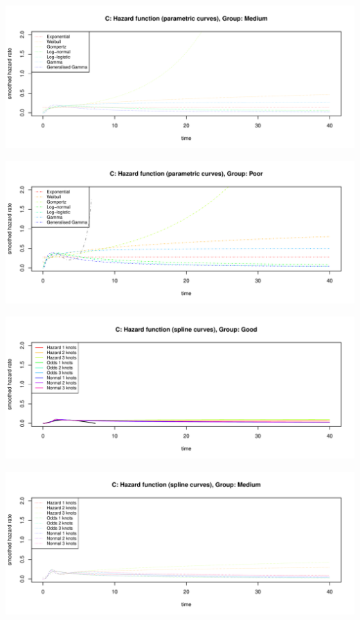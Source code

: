 \documentclass[
]{article}
\begin{document}
\begin{flushleft}\includegraphics[height=0.29\textheight]{BC_OS_output/Images/Figure_validate_extrapolation_hr-2} \end{flushleft}

\begin{flushleft}\includegraphics[height=0.29\textheight]{BC_OS_output/Images/Figure_validate_extrapolation_hr-3} \end{flushleft}

\begin{flushleft}\includegraphics[height=0.29\textheight]{BC_OS_output/Images/Figure_validate_extrapolation_hr-4} \end{flushleft}

\begin{flushleft}\includegraphics[height=0.29\textheight]{BC_OS_output/Images/Figure_validate_extrapolation_hr-5} \end{flushleft}
\end{document}
